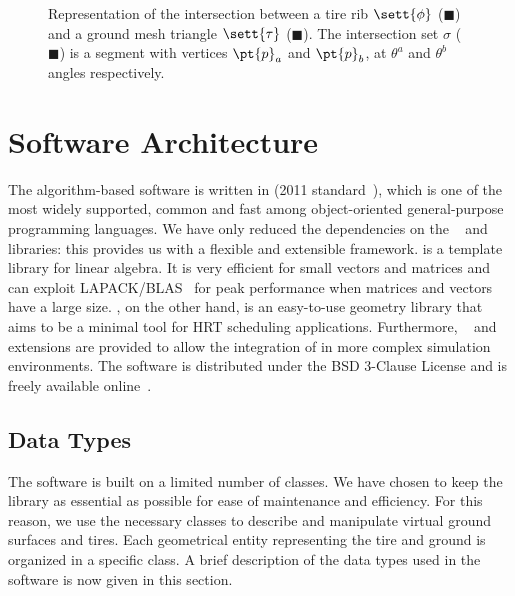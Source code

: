 \begin{figure}[htb]
  \centering
  \def\svgwidth{9cm}
  
  \caption{Representation of the intersection between a tire rib $\sett{\phi}$ (\textcolor[RGB]{255, 231, 187}{$\blacksquare$}) and a ground mesh triangle $\sett{\tau}$ (\textcolor[RGB]{255, 218, 217}{$\blacksquare$}). The intersection set $\sigma$ (\textcolor[RGB]{74, 181, 99}{$\blacksquare$}) is a segment with
  vertices $\pt{p}_a$ and $\pt{p}_b$, at $\theta^a$ and $\theta^b$ angles respectively.}
  \label{app2:fig:intersection}
\end{figure}


\section{Software Architecture}
\label{app2:sec:software_architecture}

The \Enve{} algorithm-based software is written in \cpp{} (2011 standard~\cite{stroustrup2013cpp}), which is one of the most widely supported, common and fast among object-oriented general-purpose programming languages. We have only reduced the dependencies on the \Eigen{}~\cite{eigen2010eigen} and \Acme{}~\cite{stocco2021acme} libraries: this provides us with a flexible and extensible framework. \Eigen{} is a template library for linear algebra. It is very efficient for small vectors and matrices and can exploit \ac{LAPACK}/\ac{BLAS}~\cite{anderson1999lapack} for peak performance when matrices and vectors have a large size. \Acme{}, on the other hand, is an easy-to-use geometry library that aims to be a minimal tool for \ac{HRT} scheduling applications. Furthermore, \Matlab{}~\Mex{} and \Simulink{}~\SFunction{} extensions are provided to allow the integration of \Enve{} in more complex simulation environments. The software is distributed under the BSD 3-Clause License and is freely available online~\cite{enve}.

\subsection{Data Types}
\label{app2:sec:data_types}

The software is built on a limited number of classes. We have chosen to keep the library as essential as possible for ease of maintenance and efficiency. For this reason, we use the necessary classes to describe and manipulate virtual ground surfaces and tires. Each geometrical entity representing the tire and ground is organized in a specific class. A brief description of the data types used in the software is now given in this section.

